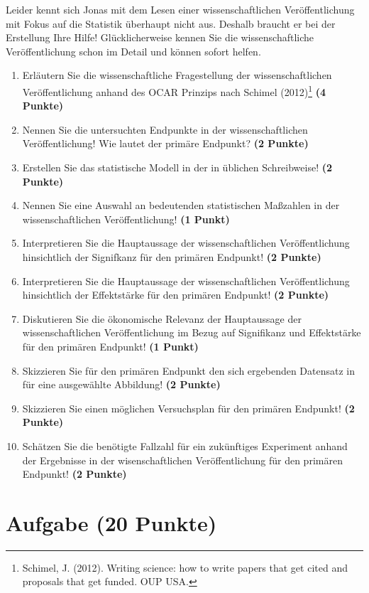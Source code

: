 \documentclass[a4paper, 9pt]{scrartcl}\usepackage[]{graphicx}\usepackage[]{xcolor}
\begin{document}
Leider kennt sich Jonas mit dem Lesen einer wissenschaftlichen Veröffentlichung mit Fokus auf die Statistik überhaupt nicht aus. Deshalb braucht er bei der Erstellung Ihre Hilfe! Glücklicherweise kennen Sie die wissenschaftliche Veröffentlichung schon im Detail und können sofort helfen.

\begin{enumerate}
  \setcounter{enumi}{0}
  \item Erläutern Sie die wissenschaftliche Fragestellung der wissenschaftlichen Veröffentlichung anhand des OCAR Prinzips nach Schimel (2012)\footnote{Schimel, J. (2012). Writing science: how to write papers that get cited and proposals that get funded. OUP USA.} \textbf{(4 Punkte)}
  \item Nennen Sie die untersuchten Endpunkte in der wissenschaftlichen Veröffentlichung! Wie lautet der primäre Endpunkt? \textbf{(2 Punkte)} 
\item Erstellen Sie das statistische Modell in der in \Rlogo üblichen Schreibweise! \textbf{(2 Punkte)}
  \item Nennen Sie eine Auswahl an bedeutenden statistischen Maßzahlen in der wissenschaftlichen Veröffentlichung! \textbf{(1 Punkt)}
  \item Interpretieren Sie die Hauptaussage der wissenschaftlichen Veröffentlichung hinsichtlich der Signifkanz für den primären Endpunkt! \textbf{(2 Punkte)}
  \item Interpretieren Sie die Hauptaussage der wissenschaftlichen Veröffentlichung hinsichtlich der Effektstärke für den primären Endpunkt! \textbf{(2 Punkte)}
  \item Diskutieren Sie die ökonomische Relevanz der Hauptaussage der wissenschaftlichen Veröffentlichung im Bezug auf Signifikanz und Effektstärke für den primären Endpunkt! \textbf{(1 Punkt)}
  \item Skizzieren Sie für den primären Endpunkt den sich ergebenden Datensatz in \Rlogo für eine ausgewählte Abbildung! \textbf{(2 Punkte)}
\item Skizzieren Sie einen möglichen Versuchsplan für den primären Endpunkt! \textbf{(2 Punkte)}
  \item Schätzen Sie die benötigte Fallzahl für ein zukünftiges Experiment anhand der Ergebnisse in der wisenschaftlichen Veröffentlichung für den primären Endpunkt! \textbf{(2 Punkte)}
\end{enumerate} 
\clearpage

\section{Aufgabe \hfill (20 Punkte)}
\end{document}
